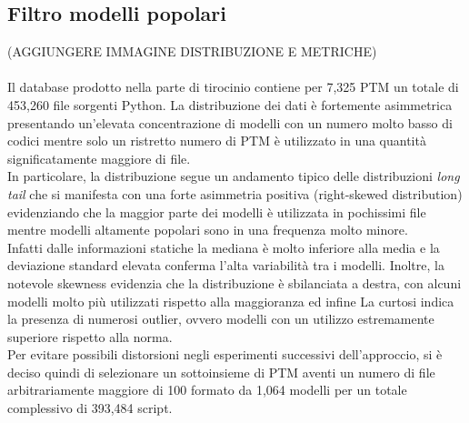 \documentclass{article}
\begin{document}
\subsection{Filtro modelli popolari}
(AGGIUNGERE IMMAGINE DISTRIBUZIONE E METRICHE)\\
\\
Il database prodotto nella parte di tirocinio contiene per 7,325 PTM un totale di 453,260 file sorgenti Python. La distribuzione dei dati è fortemente asimmetrica presentando un'elevata concentrazione di modelli con un numero molto basso di codici mentre solo un ristretto numero di PTM è utilizzato in una quantità significatamente maggiore di file.\\
In particolare, la distribuzione segue un andamento tipico delle distribuzioni \textit{long tail} che si manifesta con una forte asimmetria positiva (right-skewed distribution) evidenziando che la maggior parte dei modelli è utilizzata in pochissimi file mentre modelli altamente popolari sono in una frequenza molto minore.\\
Infatti dalle informazioni statiche la mediana è molto inferiore alla media e la deviazione standard elevata conferma l'alta variabilità tra i modelli. Inoltre, la notevole skewness evidenzia che la distribuzione è sbilanciata a destra, con alcuni modelli molto più utilizzati rispetto alla maggioranza ed infine La curtosi indica la presenza di numerosi outlier, ovvero modelli con un utilizzo estremamente superiore rispetto alla norma.\\
Per evitare possibili distorsioni negli esperimenti successivi dell'approccio, si è deciso quindi di selezionare un sottoinsieme di PTM aventi un numero di file arbitrariamente maggiore di 100 formato da 1,064 modelli per un totale complessivo di 393,484 script.
\end{document}
